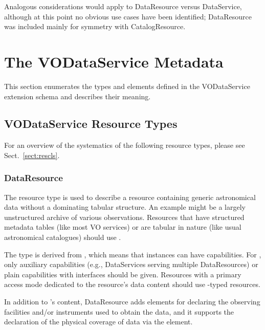 \documentclass[11pt,a4paper]{ivoa}
\begin{document}
Analogous considerations would apply to DataResource versus DataService,
although at this point no obvious use cases have been identified;
DataResource was included mainly for symmetry with CatalogResource.

\section{The VODataService Metadata}
\label{sect:metadata}


This section enumerates the types and elements defined in the
VODataService extension schema and describes their meaning.


\subsection{VODataService Resource Types}
\label{sect:resext}

For an overview of the systematics of the following resource types,
please see Sect.~\ref{sect:rescls}.

\subsubsection{DataResource}
\label{sect:DataResource}

The  resource type is used to describe a
resource containing generic astronomical data without a dominating
tabular structure.  An example might be a largely unstructured archive
of various observations.  Resources that have structured metadata tables
(like most VO services) or are tabular in nature (like usual
astronomical catalogues) should use .

The type is derived from , which means that instances
can have
capabilities.  For , only auxiliary capabilities
(e.g., DataServices serving multiple DataResources) or plain capabilities
with  interfaces should be given.  Resources with a
primary access mode dedicated to the resource's data content should use
-typed resources.

In addition to 's content, DataResource adds
elements for declaring the observing facilities and/or instruments used
to obtain the data, and it supports the declaration of
the physical coverage of data via the 
element.
\end{document}
